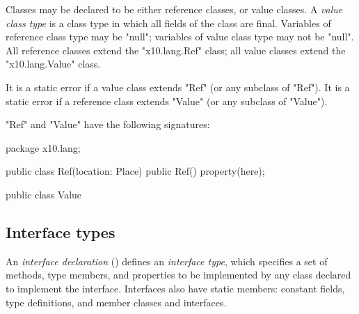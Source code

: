 
        Classes may be declared to be either reference classes,
        or value classes.
A \emph{value class type}
is a class type in which all fields of the class are final.
%
Variables of reference class type may be \xcd"null"; 
variables of value class type may not be \xcd"null".
%
        All reference classes extend the
        \xcd"x10.lang.Ref" class; all value classes
        extend the \xcd"x10.lang.Value" class.

        It is a static error if a value class extends
        \xcd"Ref" (or any subclass of \xcd"Ref").
        It is a static error if a reference class extends
        \xcd"Value" (or any subclass of \xcd"Value").

\xcd"Ref" and \xcd"Value" have the following signatures:

\begin{xten}
package x10.lang;

public class Ref(location: Place) {
    public Ref() { property(here); }
}

public class Value { }
\end{xten}



\subsection{Interface types}
\label{InterfaceTypes}


        An {\em interface declaration} ()
        defines an {\em interface type}, which specifies a set of
        methods, type members, and properties to be implemented by any class
        declared to implement the interface.  Interfaces also
        have static members: constant fields, type definitions,
        and member classes and interfaces.

